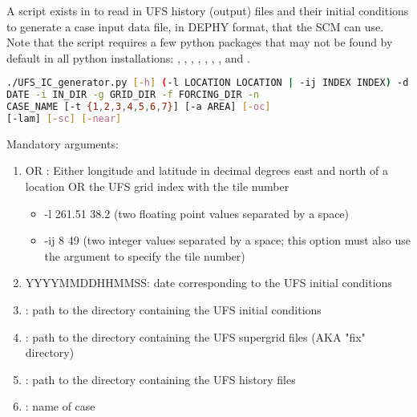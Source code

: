 A script exists in  to read in UFS history (output) files and their initial conditions to generate a case input data file, in DEPHY format, that the SCM can use. Note that the script requires a few python packages that may not be found by default in all python installations: , , , , , , , and . 

\begin{lstlisting}[language=bash]
./UFS_IC_generator.py [-h] (-l LOCATION LOCATION | -ij INDEX INDEX) -d
DATE -i IN_DIR -g GRID_DIR -f FORCING_DIR -n
CASE_NAME [-t {1,2,3,4,5,6,7}] [-a AREA] [-oc]
[-lam] [-sc] [-near]
\end{lstlisting}

Mandatory arguments:
\begin{enumerate}
\item {} OR :  Either longitude and latitude in decimal degrees east and north of a location OR the UFS grid index with the tile number
	\begin{itemize}
		\item -l 261.51 38.2 (two floating point values separated by a space)
		\item -ij 8 49 (two integer values separated by a space; this option must also use the  argument to specify the tile number)
	\end{itemize}
\item {} YYYYMMDDHHMMSS: date corresponding to the UFS initial conditions
\item {}: path to the directory containing the UFS initial conditions
\item {}: path to the directory containing the UFS supergrid files (AKA "fix" directory)
\item {}: path to the directory containing the UFS history files
\item {}: name of case
\end{enumerate}

